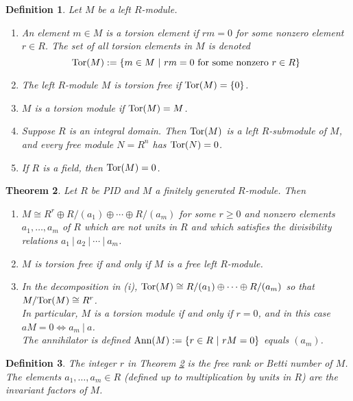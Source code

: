 \documentclass[a4paper,8pt]{article}
\newcommand{\hlt}[1]{\textit{{\color{blue}#1}}}
\newcommand{\tors}[1]{\textnormal{Tor}#1}
\newcommand{\anns}[1]{\textnormal{Ann}#1}
\theoremstyle{theorem}
\newtheorem{theorem}{Theorem}[subsection]
\newtheorem{definition}[theorem]{Definition}
\begin{document}
\begin{definition}
Let $M$ be a left $R$-module.
\begin{enumerate}[label=(\roman*)]
\item An element $m \in M$ is a \hlt{torsion element} if $rm = 0$ for some nonzero element $r\in R$. The set of all torsion elements in $M$ is denoted
\begin{equation}
\tors(M) := \{m \in M \ | \ rm = 0 \textnormal{ for some nonzero } r \in R\} \nonumber
\end{equation}
\item The left $R$-module $M$ is \hlt{torsion free} if $\tors(M) = \{0\}$.
\item $M$ is a \hlt{torsion module} if $\tors(M) = M$.
\item Suppose $R$ is an integral domain. Then $\tors(M)$ is a left $R$-submodule of $M$, and every free module $N=R^n$ has $\tors(N) = 0$.
\item If $R$ is a field, then $\tors(M) = 0$.
\end{enumerate}
\end{definition}

\begin{theorem}
\label{thm:pidmodule}
Let $R$ be PID and $M$ a finitely generated $R$-module. Then
\begin{enumerate}[label=(\roman*)]
\item $M \cong R^r \oplus R/(a_1) \oplus \cdots \oplus R/(a_m)$ for some $r \geq 0$ and nonzero elements $a_1, \ldots, a_m$ of $R$ which are not units in $R$ and which satisfies the divisibility relations $a_1 \ | \ a_2 \ | \ \cdots \ | \ a_m$.
\item $M$ is torsion free if and only if $M$ is a free left $R$-module.
\item In the decomposition in (i), $\tors(M) \cong R/(a_1) \oplus \cdots \oplus R/(a_m)$ so that $M/\tors(M) \cong R^r$.\\
In particular, $M$ is a torsion module if and only if $r=0$, and in this case $aM = 0 \Leftrightarrow a_m \ | \ a$.\\
The \hlt{annihilator} is defined $\anns(M) := \{r \in R \ | \ rM = 0\}$ equals $(a_m)$.
\end{enumerate}
\end{theorem}

\begin{definition}
The integer $r$ in Theorem \ref{thm:pidmodule} is the \hlt{free rank} or \hlt{Betti number} of $M$.\\
The elements $a_1, \ldots, a_m \in R$ (defined up to multiplication by units in $R$) are the \hlt{invariant factors of $M$}.
\end{definition}
\end{document}
